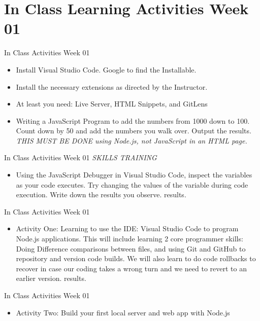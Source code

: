 \section{In Class Learning Activities Week 01}
\begin{frame}{In Class Activities Week 01}
\begin{itemize}

    \item Install Visual Studio Code. Google to find the Installable.
    \item Install the necessary extensions as directed by the Instructor.
    \item At least you need: Live Server, HTML Snippets, and GitLens
    \item Writing a JavaScript Program to add the numbers from 1000 down to 100. Count down by 50 and add the numbers you walk over. Output the results. 
    \newline \emph{THIS MUST BE DONE using Node.js, not JavaScript in an HTML page.}
\end{itemize} 
\end{frame}
\begin{frame}{In Class Activities Week 01}
\emph{SKILLS TRAINING}
\begin{itemize}    
    \item Using the JavaScript Debugger in Visual Studio Code, inspect the variables as your code executes. Try changing the values of the variable during code execution. Write down the results you observe.
results.
\end{itemize} 
\end{frame}
\begin{frame}{In Class Activities Week 01}
\begin{itemize}       
    \item Activity One: Learning to use the IDE: Visual Studio Code to program Node.js applications. This will include learning 2 core programmer skills: Doing Difference comparisons between files, and using Git and GitHub to repository and version code builds. We will also learn to do code rollbacks to recover in case our coding takes a wrong turn and we need to revert to an earlier version.
results. 
\end{itemize} 
\end{frame}
\begin{frame}{In Class Activities Week 01}
\begin{itemize}   
    \item Activity Two: Build your first local server and web app with Node.js

\end{itemize}  

\end{frame}